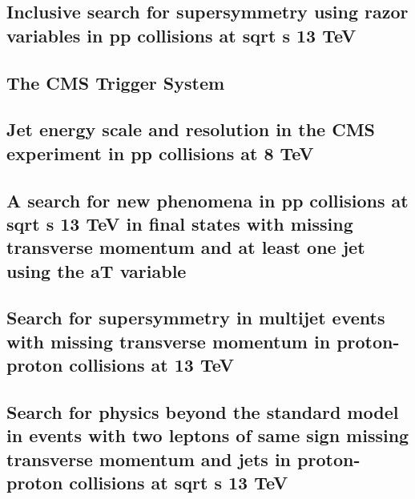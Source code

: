 \documentclass[a4paper, 11pt, twoside, openright]{report}
\begin{document}
\subsection{Inclusive search for supersymmetry using razor variables in pp collisions at  sqrt s 13 TeV}


\subsection{The CMS Trigger System}


\subsection{Jet energy scale and resolution in the CMS experiment in pp collisions at 8 TeV}


\subsection{A search for new phenomena in pp collisions at sqrt s 13 TeV in final states with missing transverse momentum and at least one jet using the aT variable}


\subsection{Search for supersymmetry in multijet events with missing transverse momentum in proton-proton collisions at 13 TeV}


\subsection{Search for physics beyond the standard model in events with two leptons of same sign missing transverse momentum and jets in proton-proton collisions at sqrt s 13 TeV}

\end{document}
